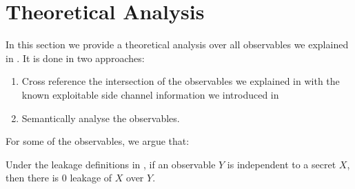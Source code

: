 
\section{Theoretical Analysis}

In this section we provide a theoretical analysis over all observables we explained in . It is done in two approaches:

\begin{enumerate}
	\item Cross reference the intersection of the observables we explained in  with the known exploitable side channel information we introduced in 
	\item Semantically analyse the observables. 
\end{enumerate}


For some of the observables, we argue that:

\begin{theorem} \label{Te: IR}
Under the leakage definitions in , if an observable $Y$ is independent to a secret $X$, then there is $0$ leakage of $X$ over $Y$.
\end{theorem}

